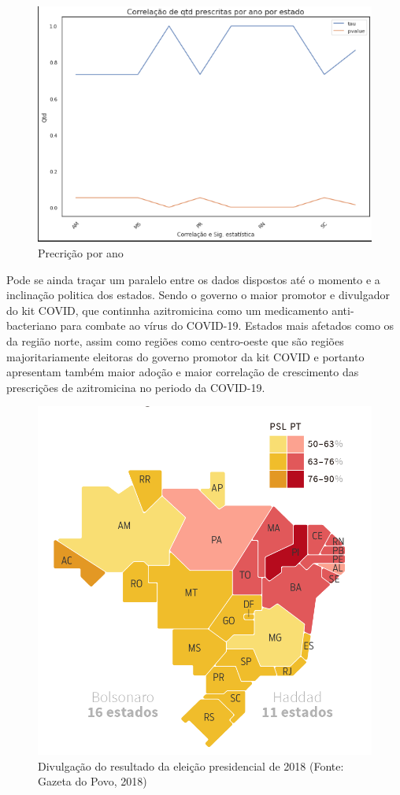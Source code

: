     \begin{figure}[!ht]
        \centering
        \includegraphics[width=0.8\linewidth]{04-figuras/corelaticao_estados.png}
        \caption{Precrição por ano}
        \label{fig:tau}
    \end{figure}

    Pode se ainda traçar um paralelo entre os dados dispostos até o momento e a inclinação politica dos estados. Sendo o governo o maior promotor e divulgador do kit COVID, que continnha azitromicina como um medicamento anti-bacteriano para combate ao vírus do COVID-19.  Estados mais afetados como os da região norte, assim como regiões como centro-oeste que são regiões majoritariamente eleitoras do governo promotor da kit COVID e portanto apresentam também maior adoção e maior correlação de crescimento das prescrições de azitromicina no periodo da COVID-19.

    \begin{figure}[!ht]
        \centering
        \includegraphics[width=0.8\linewidth]{04-figuras/estados_eleitores_atual_governo.png}
        \caption[Divulgação do resultado da eleição presidencial de 2018]{Divulgação do resultado da eleição presidencial de 2018 (Fonte: Gazeta do Povo, 2018) }
        \label{fig:tau}
    \end{figure}